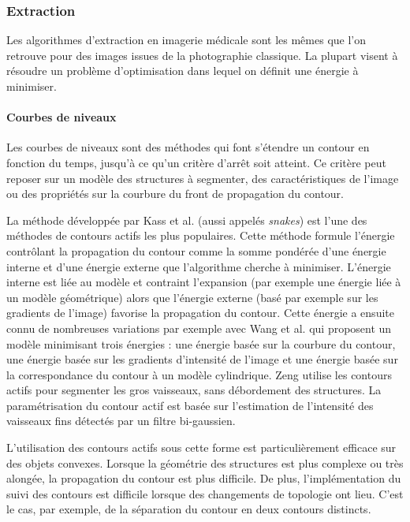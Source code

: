     \subsubsection{Extraction}

      Les algorithmes d'extraction en imagerie médicale sont les mêmes que l'on retrouve pour des images issues de la photographie classique. La plupart visent à résoudre un problème d'optimisation dans lequel on définit une énergie à minimiser.

      \paragraph{Courbes de niveaux} 
      Les courbes de niveaux sont des méthodes qui font s'étendre un contour en fonction du temps, jusqu'à ce qu'un critère d'arrêt soit atteint. Ce critère peut reposer sur un modèle des structures à segmenter, des caractéristiques de l'image ou des propriétés sur la courbure du front de propagation du contour.

      La méthode développée par Kass et al. \cite{Kass1988_snakes} (aussi appelés \textit{snakes}) est l'une des méthodes de contours actifs les plus populaires. Cette méthode formule l'énergie contrôlant la propagation du contour comme la somme pondérée d'une énergie interne et d'une énergie externe que l'algorithme cherche à minimiser. L'énergie interne est liée au modèle et contraint l'expansion (par exemple une énergie liée à un modèle géométrique) alors que l'énergie externe (basé par exemple sur les gradients de l'image) favorise la propagation du contour. Cette énergie a ensuite connu de nombreuses variations par exemple avec Wang et al. \cite{Wang2012_vessel_level_set} qui proposent un modèle minimisant trois énergies : une énergie basée sur la courbure du contour, une énergie basée sur les gradients d'intensité de l'image et une énergie basée sur la correspondance du contour à un modèle cylindrique. Zeng \cite{Zeng2018_liver_hybrid_active_contour_region_growing} utilise les contours actifs pour segmenter les gros vaisseaux, sans débordement des structures. La paramétrisation du contour actif est basée sur l'estimation de l'intensité des vaisseaux fins détectés par un filtre bi-gaussien.

      L'utilisation des contours actifs sous cette forme est particulièrement efficace sur des objets convexes. Lorsque la géométrie des structures est plus complexe ou très alongée, la propagation du contour est plus difficile. De plus, l'implémentation du suivi des contours est difficile lorsque des changements de topologie ont lieu. C'est le cas, par exemple, de la séparation du contour en deux contours distincts.
      
